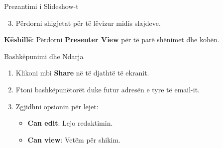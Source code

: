 \documentclass[
  ignorenonframetext,
]{beamer}
\providecommand{\tightlist}{%
  \setlength{\itemsep}{0pt}\setlength{\parskip}{0pt}}
\begin{document}
\begin{frame}{Prezantimi i Slideshow-t}
\label{prezantimi-i-slideshow-t-1}
\begin{enumerate}
\setcounter{enumi}{2}
\tightlist
\item
  Përdorni shigjetat për të lëvizur midis slajdeve.
\end{enumerate}

\textbf{Këshillë}: Përdorni \textbf{Presenter View} për të parë shënimet
dhe kohën.
\end{frame}

\begin{frame}{Bashkëpunimi dhe Ndarja}
\label{bashkuxebpunimi-dhe-ndarja}
\begin{enumerate}
\item
  Klikoni mbi \textbf{Share} në të djathtë të ekranit.
\item
  Ftoni bashkëpunëtorët duke futur adresën e tyre të email-it.
\item
  Zgjidhni opsionin për lejet:

  \begin{itemize}
  \item
    \textbf{Can edit}: Lejo redaktimin.
  \item
    \textbf{Can view}: Vetëm për shikim.
  \end{itemize}
\end{enumerate}
\end{frame}
\end{document}
